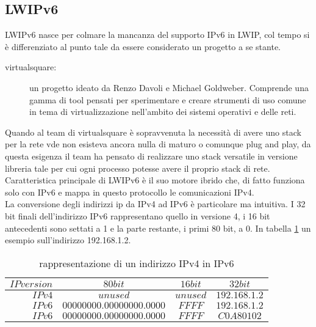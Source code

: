 \subsection{LWIPv6}
LWIPv6\cite{K6} nasce per colmare la mancanza del supporto IPv6 in LWIP, col tempo si \`e differenziato al punto tale da essere considerato un progetto a se stante.\\
\begin{description}                     %
  \item[virtualsquare\cite{K15}: ] un progetto ideato da Renzo Davoli e Michael Goldweber. Comprende una gamma di tool pensati per sperimentare e creare strumenti di uso comune in tema di virtualizzazione nell'ambito dei sistemi operativi e delle reti.
\end{description}
Quando al team di virtualsquare \`e sopravvenuta la necessit\`a di avere uno stack per la rete vde non esisteva ancora nulla di maturo o comunque plug and play, da questa esigenza il team ha pensato di realizzare uno stack versatile in versione libreria tale per cui ogni processo potesse avere il proprio stack di rete.\\
Caratteristica principale di LWIPv6 \`e il suo motore ibrido che, di fatto funziona solo con IPv6 e mappa in questo protocollo le comunicazioni IPv4.\\
La conversione degli indirizzi ip da IPv4 ad IPv6 \`e particolare ma intuitiva. I 32 bit finali dell'indirizzo IPv6 rappresentano quello in versione 4, i 16 bit antecedenti sono settati a 1 e la parte restante, i primi 80 bit, a 0. In tabella \ref{tab:IPv4toIPv6} un esempio sull'indirizzo 192.168.1.2.
\begin{table}[h]                        %
\begin{center}                          %
\begin{tabular}{r|c|c|c}                  %
\hline
$IP version$ & $80 bit$ & $16 bit$ & $32 bit$\\
\hline \hline                         %
$IPv4$ & $unused$  & $unused$  & $192.168.1.2$\\           %
\hline                                  %
$IPv6$ & $00000000.00000000.0000$ & $FFFF$ & $192.168.1.2$\\           %
\hline                                  %
$IPv6$ & $00000000.00000000.0000$ & $FFFF$ & $C0A80102$\\
\hline                           %
\end{tabular}
\caption[IPv4 to IPv6 conversion]{rappresentazione di un indirizzo IPv4 in IPv6}\label{tab:IPv4toIPv6}
\end{center}
\end{table}

